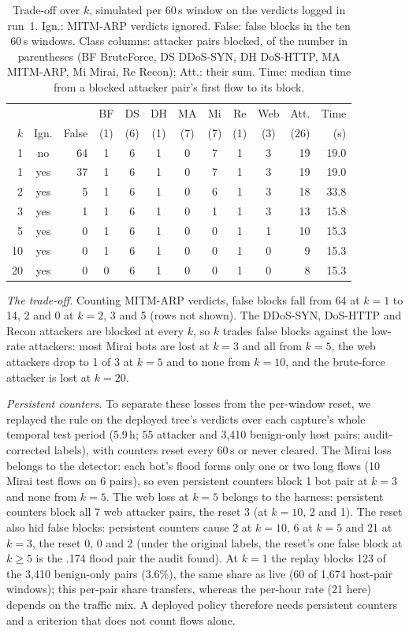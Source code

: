 \begin{table}[t]
\centering
\caption{Trade-off over $k$, simulated per 60\,s window on the verdicts logged in run~1. Ign.: MITM-ARP verdicts ignored. False: false blocks in the ten 60\,s windows. Class columns: attacker pairs blocked, of the number in parentheses (BF BruteForce, DS DDoS-SYN, DH DoS-HTTP, MA MITM-ARP, Mi Mirai, Re Recon); Att.: their sum. Time: median time from a blocked attacker pair's first flow to its block.}
\label{tab:kcurve}
\footnotesize
\setlength{\tabcolsep}{2.4pt}
\begin{tabular}{rcrcccccccrr}
\hline
 & & & BF & DS & DH & MA & Mi & Re & Web & Att. & Time \\
$k$ & Ign. & False & (1) & (6) & (1) & (7) & (7) & (1) & (3) & (26) & (s) \\
\hline
1  & no  & 64 & 1 & 6 & 1 & 0 & 7 & 1 & 3 & 19 & 19.0 \\
1  & yes & 37 & 1 & 6 & 1 & 0 & 7 & 1 & 3 & 19 & 19.0 \\
2  & yes &  5 & 1 & 6 & 1 & 0 & 6 & 1 & 3 & 18 & 33.8 \\
3  & yes &  1 & 1 & 6 & 1 & 0 & 1 & 1 & 3 & 13 & 15.8 \\
5  & yes &  0 & 1 & 6 & 1 & 0 & 0 & 1 & 1 & 10 & 15.3 \\
10 & yes &  0 & 1 & 6 & 1 & 0 & 0 & 1 & 0 &  9 & 15.3 \\
20 & yes &  0 & 0 & 6 & 1 & 0 & 0 & 1 & 0 &  8 & 15.3 \\
\hline
\end{tabular}
\end{table}

\emph{The trade-off.} Counting MITM-ARP verdicts, false blocks fall from 64 at $k=1$ to 14, 2 and 0 at $k=2$, 3 and 5 (rows not shown). The DDoS-SYN, DoS-HTTP and Recon attackers are blocked at every $k$, so $k$ trades false blocks against the low-rate attackers: most Mirai bots are lost at $k=3$ and all from $k=5$, the web attackers drop to 1 of 3 at $k=5$ and to none from $k=10$, and the brute-force attacker is lost at $k=20$.

\emph{Persistent counters.} To separate these losses from the per-window reset, we replayed the rule on the deployed tree's verdicts over each capture's whole temporal test period (5.9\,h; 55 attacker and 3,410 benign-only host pairs; audit-corrected labels), with counters reset every 60\,s or never cleared. The Mirai loss belongs to the detector: each bot's flood forms only one or two long flows (10 Mirai test flows on 6 pairs), so even persistent counters block 1 bot pair at $k=3$ and none from $k=5$. The web loss at $k=5$ belongs to the harness: persistent counters block all 7 web attacker pairs, the reset 3 (at $k=10$, 2 and 1). The reset also hid false blocks: persistent counters cause 2 at $k=10$, 6 at $k=5$ and 21 at $k=3$, the reset 0, 0 and 2 (under the original labels, the reset's one false block at $k\ge5$ is the .174 flood pair the audit found). At $k=1$ the replay blocks 123 of the 3,410 benign-only pairs (3.6\%), the same share as live (60 of 1,674 host-pair windows); this per-pair share transfers, whereas the per-hour rate (21 here) depends on the traffic mix. A deployed policy therefore needs persistent counters and a criterion that does not count flows alone.

